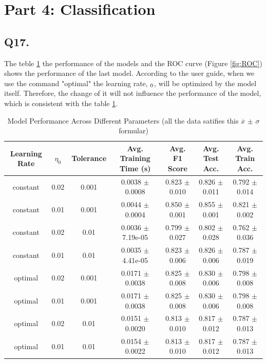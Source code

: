 \documentclass{article}
\begin{document}
\newpage

\section*{Part 4: Classification}

\subsection*{Q17.}

The teble \ref{tab:complete_model_performance} the performance of the models and the ROC curve (Figure \ref{fig:ROC}) shows the performance of the last model.
According to the user guide, when we use the command "optimal" the learning rate, $\iterate_0$, will be optimized by the model itself. Therefore, the change of it will not influence the performance of the model, which is consistent with the table \ref{tab:complete_model_performance}.

\begin{table}[htbp]
    \centering
    \small
    \begin{tabular}{ccccccc}
    \toprule
    Learning Rate & $\eta_0$ & Tolerance & Avg. Training Time (s) & Avg. F1 Score & Avg. Test Acc. & Avg. Train Acc. \\
    \midrule
    constant & 0.02 & 0.001 & 0.0038 $\pm$ 0.0008 & 0.823 $\pm$ 0.010 & 0.826 $\pm$ 0.011 & 0.792 $\pm$ 0.014 \\
    constant & 0.01 & 0.001 & 0.0044 $\pm$ 0.0004 & 0.850 $\pm$ 0.001 & 0.855 $\pm$ 0.001 & 0.821 $\pm$ 0.002 \\
    constant & 0.02 & 0.01 & 0.0036 $\pm$ 7.19e-05 & 0.799 $\pm$ 0.027 & 0.802 $\pm$ 0.028 & 0.762 $\pm$ 0.036 \\
    constant & 0.01 & 0.01 & 0.0035 $\pm$ 4.41e-05 & 0.823 $\pm$ 0.006 & 0.826 $\pm$ 0.006 & 0.787 $\pm$ 0.019 \\
    optimal & 0.02 & 0.001 & 0.0171 $\pm$ 0.0038 & 0.825 $\pm$ 0.008 & 0.830 $\pm$ 0.006 & 0.798 $\pm$ 0.008 \\
    optimal & 0.01 & 0.001 & 0.0171 $\pm$ 0.0038 & 0.825 $\pm$ 0.008 & 0.830 $\pm$ 0.006 & 0.798 $\pm$ 0.008 \\
    optimal & 0.02 & 0.01 & 0.0151 $\pm$ 0.0020 & 0.813 $\pm$ 0.010 & 0.817 $\pm$ 0.012 & 0.787 $\pm$ 0.013 \\
    optimal & 0.01 & 0.01 & 0.0154 $\pm$ 0.0022 & 0.813 $\pm$ 0.010 & 0.817 $\pm$ 0.012 & 0.787 $\pm$ 0.013 \\
    \bottomrule
    \end{tabular}
    \caption{Model Performance Across Different Parameters  (all the data satifies this $\overline{x}$ $\pm$ $\sigma$ formular)}
    \label{tab:complete_model_performance}
\end{table}
    
\end{document}

